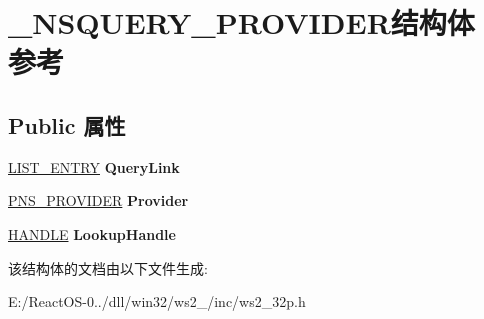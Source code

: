 \hypertarget{struct___n_s_q_u_e_r_y___p_r_o_v_i_d_e_r}{}\section{\+\_\+\+N\+S\+Q\+U\+E\+R\+Y\+\_\+\+P\+R\+O\+V\+I\+D\+E\+R结构体 参考}
\label{struct___n_s_q_u_e_r_y___p_r_o_v_i_d_e_r}
\subsection*{Public 属性}
\begin{DoxyCompactItemize}
\item 
\mbox{\label{struct___n_s_q_u_e_r_y___p_r_o_v_i_d_e_r_a67547b3abc38e0edba8e12580e280cfb}} 
\hyperlink{struct___l_i_s_t___e_n_t_r_y}{L\+I\+S\+T\+\_\+\+E\+N\+T\+RY} {\bfseries Query\+Link}
\item 
\mbox{\label{struct___n_s_q_u_e_r_y___p_r_o_v_i_d_e_r_a881234530820479df5f6692f3c39aa24}} 
\hyperlink{struct___n_s_p_r_o_v_i_d_e_r}{P\+N\+S\+\_\+\+P\+R\+O\+V\+I\+D\+ER} {\bfseries Provider}
\item 
\mbox{\label{struct___n_s_q_u_e_r_y___p_r_o_v_i_d_e_r_aebe35214dd28541a13f2b3fb990aa848}} 
\hyperlink{interfacevoid}{H\+A\+N\+D\+LE} {\bfseries Lookup\+Handle}
\end{DoxyCompactItemize}


该结构体的文档由以下文件生成\+:\begin{DoxyCompactItemize}
\item 
E\+:/\+React\+O\+S-\/0../dll/win32/ws2\+\_/inc/ws2\+\_\+32p.\+h\end{DoxyCompactItemize}
